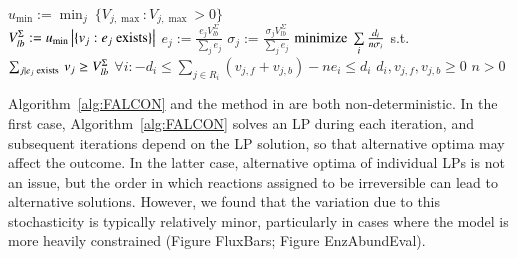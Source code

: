 \begin{AlgFloat}[H]
\begin{Algorithm}[FALCON]
\label{alg:FALCON}
\begin{algorithmic}
~\\
$u_{\min} := \min_j\ \{V_{j,\max} : V_{j,\max} > 0\}$\\
$V_{lb}^{\Sigma} := u_{\min} \left|\{v_j : e_j \textnormal{ exists}\}\right|$
  \State $e_j := \frac{e_j V_{lb}^{\Sigma}}
    {\sum\limits_{j} e_j}$ 
  \State $\sigma_j := \frac{\sigma_j V_{lb}^{\Sigma}}
    {\sum\limits_{j} e_j}$
\EndFor
{}
  \State $\textnormal{minimize}\ \sum\limits_i \frac{d_i}{n
    \sigma_i}$
  \State s.t.
  \State $\sum_{j \mid e_j \textnormal{ exists }} v_j \geq V_{lb}^{\Sigma}$ 
  \State $\forall i: -d_i \leq \sum\nolimits_{j \in R_i} (v_{j,f} +
    v_{j,b}) - n e_i \leq d_i$ 
  \State $d_i, v_{j,f}, v_{j,b} \geq 0$ 
  \State $n > 0$
  \EndFor
\EndWhile
\end{algorithmic}
\end{Algorithm}
\end{AlgFloat}

Algorithm~\ref{alg:FALCON} and the method in \citealt{Lee2012} are
both non-deterministic. In the first case, Algorithm~\ref{alg:FALCON}
solves an LP during each iteration, and subsequent iterations depend
on the LP solution, so that alternative optima may affect the outcome.
In the latter case, alternative optima of individual LPs is not an
issue, but the order in which reactions assigned to be irreversible can
lead to alternative solutions. However, we
found that the variation due to this stochasticity is typically 
relatively minor, particularly in cases where the model is more 
heavily constrained (Figure FluxBars; Figure EnzAbundEval).



